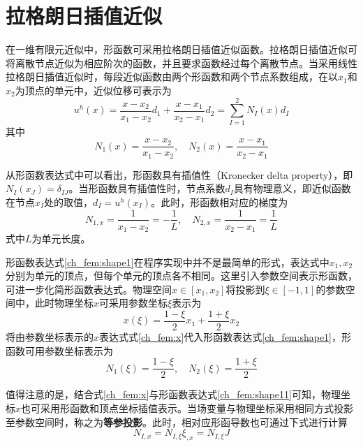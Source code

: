 \section{拉格朗日插值近似}
在一维有限元近似中，形函数可采用拉格朗日插值近似函数。拉格朗日插值近似可将离散节点近似为相应阶次的函数，并且要求函数经过每个离散节点。当采用线性拉格朗日插值近似时，每段近似函数由两个形函数和两个节点系数组成，在以$x_1$和$x_2$为顶点的单元中，近似位移可表示为
\begin{equation}
u^h(x) = \frac{x-x_2}{x_1-x_2} d_1 + \frac{x-x_1}{x_2-x_1} d_2 = \sum_{I=1}^{2} N_I(x) d_I
\end{equation}
其中
\begin{equation}\label{ch_fem:shape1}
N_1(x) = \frac{x-x_2}{x_1-x_2}, \quad N_2(x) = \frac{x-x_1}{x_2-x_1}
\end{equation}\par
从形函数表达式中可以看出，形函数具有插值性（Kronecker delta property），即$N_I(x_J)=\delta_{IJ}$。当形函数具有插值性时，节点系数$d_I$具有物理意义，即近似函数在节点$x_I$处的取值，$d_I=u^h(x_I)$。此时，形函数相对应的梯度为
\begin{equation}\label{ch_fem:dshape}
N_{1,x} = \frac{1}{x_1-x_2} = - \frac{1}{L}, \quad N_{2,x} = \frac{1}{x_2-x_1} = \frac{1}{L}
\end{equation}
式中$L$为单元长度。\par
形函数表达式\eqref{ch_fem:shape1}在程序实现中并不是最简单的形式，表达式中$x_1,x_2$分别为单元的顶点，但每个单元的顶点各不相同。这里引入参数空间表示形函数，可进一步化简形函数表达式。物理空间$x\in[x_1,x_2]$将投影到$\xi\in[-1,1]$的参数空间中，此时物理坐标$x$可采用参数坐标$\xi$表示为
\begin{equation}\label{ch_fem:x}
x(\xi)=\frac{1-\xi}{2}x_1 + \frac{1+\xi}{2}x_2
\end{equation}
将由参数坐标表示的$x$表达式式\eqref{ch_fem:x}代入形函数表达式\eqref{ch_fem:shape1}，形函数可用参数坐标表示为
\begin{equation}\label{ch_fem:shape11}
N_1(\xi) = \frac{1-\xi}{2}, \quad N_2(\xi) = \frac{1+\xi}{2}
\end{equation} \par
值得注意的是，结合式\eqref{ch_fem:x}与形函数表达式\eqref{ch_fem:shape11}可知，物理坐标$x$也可采用形函数和顶点坐标插值表示。当场变量与物理坐标采用相同方式投影至参数空间时，称之为\textbf{等参投影}。此时，相对应形函导数也可通过下式进行计算
\begin{equation}
N_{I,x} = N_{I,\xi} \xi_{,x} = N_{I,\xi} J
\end{equation}
